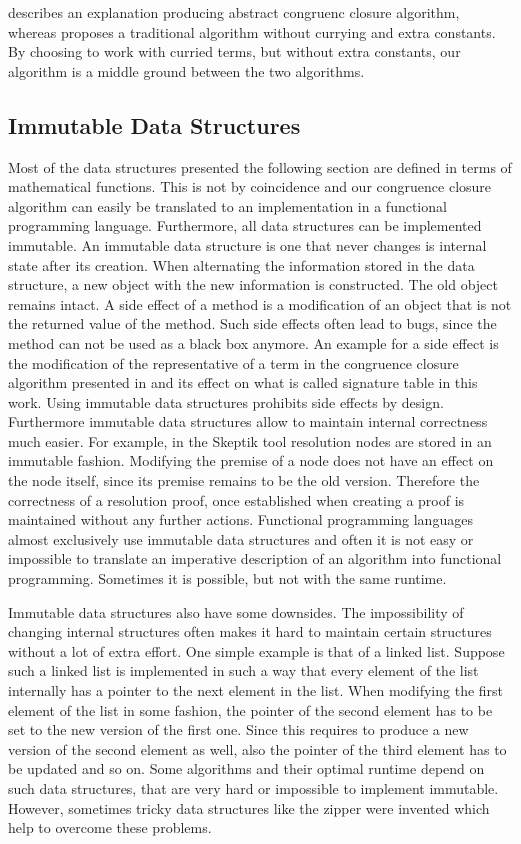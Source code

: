 \cite{Nieuwenhuis2005,Nieuwenhuis2007} describes an explanation producing abstract congruenc closure algorithm, 
whereas \cite{Fontaine2004} proposes a traditional algorithm without currying and extra constants.
By choosing to work with curried terms, but without extra constants, our algorithm is a middle ground between the two algorithms.

\subsection*{Immutable Data Structures}

Most of the data structures presented the following section are defined in terms of mathematical functions.
This is not by coincidence and our congruence closure algorithm can easily be translated to an implementation in a functional programming language.
Furthermore, all data structures can be implemented immutable.
An immutable data structure is one that never changes is internal state after its creation.
When alternating the information stored in the data structure, a new object with the new information is constructed.
The old object remains intact.
A side effect of a method is a modification of an object that is not the returned value of the method.
Such side effects often lead to bugs, since the method can not be used as a black box anymore.
An example for a side effect is the modification of the representative of a term in the congruence closure algorithm presented in \cite{Fontaine2004} and its effect on what is called signature table in this work.
Using immutable data structures prohibits side effects by design.
Furthermore immutable data structures allow to maintain internal correctness much easier.
For example, in the Skeptik tool resolution nodes are stored in an immutable fashion.
Modifying the premise of a node does not have an effect on the node itself, since its premise remains to be the old version.
Therefore the correctness of a resolution proof, once established when creating a proof is maintained without any further actions.
Functional programming languages almost exclusively use immutable data structures and often it is not easy or impossible to translate an imperative description of an algorithm into functional programming.
Sometimes it is possible, but not with the same runtime.

Immutable data structures also have some downsides.
The impossibility of changing internal structures often makes it hard to maintain certain structures without a lot of extra effort.
One simple example is that of a linked list.
Suppose such a linked list is implemented in such a way that every element of the list internally has a pointer to the next element in the list.
When modifying the first element of the list in some fashion, the pointer of the second element has to be set to the new version of the first one.
Since this requires to produce a new version of the second element as well, also the pointer of the third element has to be updated and so on.
Some algorithms and their optimal runtime depend on such data structures, that are very hard or impossible to implement immutable.
However, sometimes tricky data structures like the zipper were invented which help to overcome these problems.

